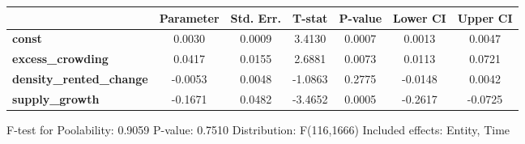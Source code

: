 \begin{center}
\begin{tabular}{lclc}
\bottomrule
\end{tabular}
\begin{tabular}{lcccccc}
                                 & \textbf{Parameter} & \textbf{Std. Err.} & \textbf{T-stat} & \textbf{P-value} & \textbf{Lower CI} & \textbf{Upper CI}  \\
\midrule
\textbf{const}                   &       0.0030       &       0.0009       &      3.4130     &      0.0007      &       0.0013      &       0.0047       \\
\textbf{excess\_crowding}        &       0.0417       &       0.0155       &      2.6881     &      0.0073      &       0.0113      &       0.0721       \\
\textbf{density\_rented\_change} &      -0.0053       &       0.0048       &     -1.0863     &      0.2775      &      -0.0148      &       0.0042       \\
\textbf{supply\_growth}          &      -0.1671       &       0.0482       &     -3.4652     &      0.0005      &      -0.2617      &      -0.0725       \\
\bottomrule
\end{tabular}
\end{center}

F-test for Poolability: 0.9059 \newline
 P-value: 0.7510 \newline
 Distribution: F(116,1666) \newline
  \newline
 Included effects: Entity, Time